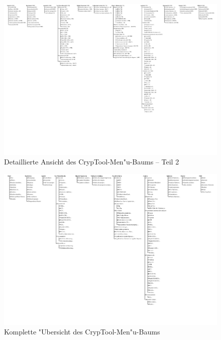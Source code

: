 \begin{figure}[b]
\begin{center}
\includegraphics[scale=1.1, clip, viewport=426 167 832 598]{figures/cryptool-menu-detail-de}
\caption{Detaillierte Ansicht des CrypTool-Men"u-Baums -- Teil 2}
\label{menu-detail-2}
\end{center}
\end{figure}
\clearpage
\begin{figure}[hb]
\begin{center}
\vspace{-30pt}
\includegraphics[scale=0.75, angle=270, viewport=14 72 835 590]{figures/cryptool-menu-de}
\caption{Komplette "Ubersicht des CrypTool-Men"u-Baums} 
\label{menuoverview}
\end{center}
\end{figure}
\clearpage
